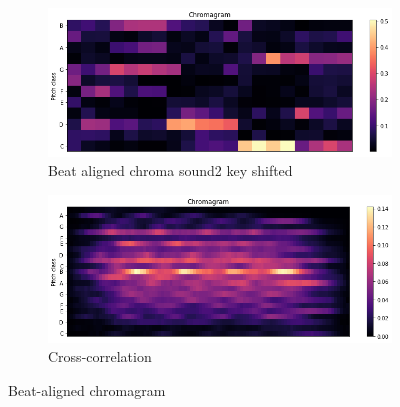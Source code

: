 \begin{figure}[htbp]
{{			\begin{subfigure}{.495\textwidth}
				\centering     
				\includegraphics[scale=0.3]{Images/Chroma/beatalignedchroma2_ks.png}
				\caption{Beat aligned chroma sound2 key shifted}
				\label{cks2}
			\end{subfigure}%
			\begin{subfigure}{.495\textwidth}
				\centering     
				\includegraphics[scale=0.3]{Images/Chroma/beatalignedchroma_corr.png}
				\caption{Cross-correlation}
				\label{c2}
			\end{subfigure}%
	}}
	\caption{Beat-aligned chromagram}
	\label{fig:beatalign}
\end{figure}

